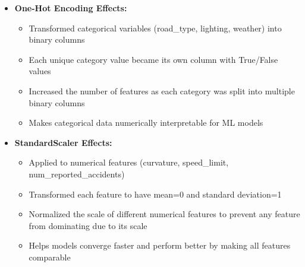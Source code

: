 \documentclass[12pt,a4paper]{article}
\begin{document}
\begin{itemize}
    \item \textbf{One-Hot Encoding Effects:}
    \begin{itemize}
        \item Transformed categorical variables (road\_type, lighting, weather) into binary columns
        \item Each unique category value became its own column with True/False values
        \item Increased the number of features as each category was split into multiple binary columns
        \item Makes categorical data numerically interpretable for ML models
    \end{itemize}
    
    \item \textbf{StandardScaler Effects:}
    \begin{itemize}
        \item Applied to numerical features (curvature, speed\_limit, num\_reported\_accidents)
        \item Transformed each feature to have mean=0 and standard deviation=1
        \item Normalized the scale of different numerical features to prevent any feature from dominating due to its scale
        \item Helps models converge faster and perform better by making all features comparable
    \end{itemize}
\end{itemize}
\end{document}
